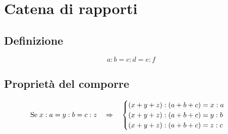 \chapter{Catena di rapporti}
\section{Definizione}
\begin{equation}
a:b=c:d=e:f
\end{equation}
\section{Proprietà del comporre}
\begin{equation}                       
\text{Se\;}x:a=y:b=c:z\quad\Rightarrow\quad \begin{cases}
(x+y+z):(a+b+c)=x:a\\
(x+y+z):(a+b+c)=y:b\\
(x+y+z):(a+b+c)=z:c
\end{cases}
\end{equation}
